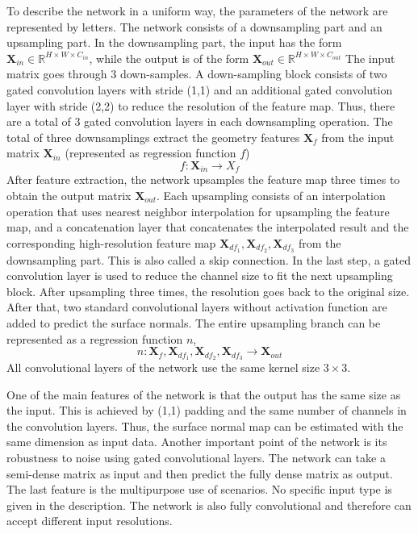 To describe the network in a uniform way, the parameters of the network are represented by letters.
The network consists of a downsampling part and an upsampling part. In the downsampling part, the input has the form $ \textbf{X}_{in} \in \mathbb{R}^{H\times W\times C_{in}}$, while the output is of the form $ \textbf{X}_{out} \in \mathbb{R}^{H\times W\times C_{out}}$
The input matrix goes through 3 down-samples. A down-sampling block consists of two gated convolution layers with stride (1,1) and an additional gated convolution layer with stride (2,2) to reduce the resolution of the feature map. Thus, there are a total of 3 gated convolution layers in each downsampling operation.
The total of three downsamplings extract the geometry features $ \textbf{X}_f $ from the input matrix $ \textbf{X}_{in} $ (represented as regression function $ f $)
\[ f: \textbf{X}_{in} \rightarrow X_f \]
After feature extraction, the network upsamples the feature map three times to obtain the output matrix $ \textbf{X}_{out} $. Each upsampling consists of an interpolation operation that uses nearest neighbor interpolation for upsampling the feature map, and a concatenation layer that concatenates the interpolated result and the corresponding high-resolution feature map $ \textbf{X}_{df_1}, \textbf{X}_{df_2}, \textbf{X}_{df_3} $ from the downsampling part. This is also called a skip connection. In the last step, a gated convolution layer is used to reduce the channel size to fit the next upsampling block. After upsampling three times, the resolution goes back to the original size. After that, two standard convolutional layers without activation function are added to predict the surface normals. The entire upsampling branch can be represented as a regression function $ n $,
\[ n: \textbf{X}_f, \textbf{X}_{df_1}, \textbf{X}_{df_2}, \textbf{X}_{df_3} \rightarrow \textbf{X}_{out} \]
All convolutional layers of the network use the same kernel size $ 3\times 3 $. 


One of the main features of the network is that the output has the same size as the input. This is achieved by (1,1) padding and the same number of channels in the convolution layers. Thus, the surface normal map can be estimated with the same dimension as input data. Another important point of the network is its robustness to noise using gated convolutional layers. The network can take a semi-dense matrix as input and then predict the fully dense matrix as output. The last feature is the multipurpose use of scenarios. No specific input type is given in the description. 
The network is also fully convolutional and therefore can accept different input resolutions. 


